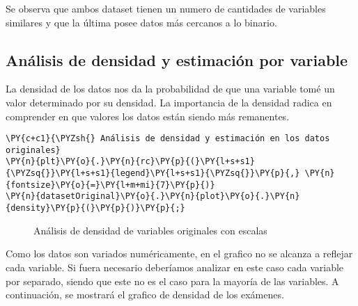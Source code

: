     Se observa que ambos dataset tienen un numero de cantidades de variables
similares y que la última posee datos más cercanos a lo binario.

    \hypertarget{anuxe1lisis-de-densidad-y-estimaciuxf3n-por-variable}{%
\subsection{Análisis de densidad y estimación por
variable}\label{anuxe1lisis-de-densidad-y-estimaciuxf3n-por-variable}}

La densidad de los datos nos da la probabilidad de que una variable tomé
un valor determinado por su densidad. La importancia de la densidad
radica en comprender en que valores los datos están siendo más
remanentes.

    \begin{tcolorbox}[breakable, size=fbox, boxrule=1pt, pad at break*=1mm,colback=cellbackground, colframe=cellborder]
\begin{Verbatim}[commandchars=\\\{\}]
\PY{c+c1}{\PYZsh{} Análisis de densidad y estimación en los datos originales}
\PY{n}{plt}\PY{o}{.}\PY{n}{rc}\PY{p}{(}\PY{l+s+s1}{\PYZsq{}}\PY{l+s+s1}{legend}\PY{l+s+s1}{\PYZsq{}}\PY{p}{,} \PY{n}{fontsize}\PY{o}{=}\PY{l+m+mi}{7}\PY{p}{)}
\PY{n}{datasetOriginal}\PY{o}{.}\PY{n}{plot}\PY{o}{.}\PY{n}{density}\PY{p}{(}\PY{p}{)}\PY{p}{;}
\end{Verbatim}
\end{tcolorbox}

\begin{center}
    	\begin{figure}[H]
	\centering
	\caption{Análisis de densidad de variables originales con escalas}
	\label{fig:advoe}
	\end{figure}
\end{center}
    
    Como los datos son variados numéricamente, en el grafico no se alcanza a
reflejar cada variable. Si fuera necesario deberíamos analizar en este
caso cada variable por separado, siendo que este no es el caso para la
mayoría de las variables. A continuación, se mostrará el grafico de
densidad de los exámenes.

